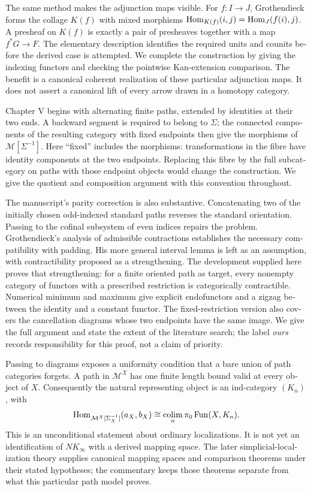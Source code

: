\begin{otherlanguage}{english}
The same method makes the adjunction maps visible. For $f:I\to J$,
Grothendieck forms the collage $K(f)$ with mixed morphisms
$\mathrm{Hom}_{K(f)}(i,j)=\mathrm{Hom}_J(f(i),j)$. A presheaf on $K(f)$ is exactly a
pair of presheaves together with a map $f^*G\to F$. The elementary
description identifies the required units and counits before the derived
case is attempted. We complete the construction by giving the indexing
functors and checking the pointwise Kan-extension comparison. The benefit
is a canonical coherent realization of these particular adjunction maps.
It does not assert a canonical lift of every arrow drawn in a homotopy
category.

Chapter V begins with alternating finite paths, extended by identities at
their two ends. A backward segment is required to belong to $\Sigma$;
the connected components of the resulting category with fixed endpoints
then give the morphisms of $\mathcal M[\Sigma^{-1}]$. Here ``fixed'' includes
the morphisms: transformations in the fibre have identity components at
the two endpoints. Replacing this fibre by the full subcategory on paths
with those endpoint objects would change the construction. We give the
quotient and composition argument with this convention throughout.

The manuscript's parity correction is also substantive. Concatenating two
of the initially chosen odd-indexed standard paths reverses the standard
orientation. Passing to the cofinal subsystem of even indices repairs the
problem. Grothendieck's analysis of admissible contractions establishes the
necessary compatibility with padding. His more general interval lemma is
left as an assumption, with contractibility proposed as a strengthening.
The development supplied here proves that strengthening: for a finite
oriented path as target, every nonempty category of functors with a prescribed
restriction is categorically contractible. Numerical minimum and maximum
give explicit endofunctors and a zigzag between the identity and a constant
functor. The fixed-restriction version also covers the cancellation diagrams
whose two endpoints have the same image. We give the full argument and state
the extent of the literature search; the label \emph{ours} records responsibility
for this proof, not a claim of priority.

Passing to diagrams exposes a uniformity condition that a bare union of
path categories forgets. A path in $\mathcal M^X$ has one finite length
bound valid at every object of $X$. Consequently the natural representing
object is an ind-category $(K_n)$, with
\[
 \mathrm{Hom}_{\mathcal M^X[\Sigma_X^{-1}]}(a_X,b_X)
   \cong\mathop{\rm colim}_n\pi_0\operatorname{Fun}(X,K_n).
\]
This is an unconditional statement about ordinary localizations. It is
not yet an identification of $NK_\infty$ with a derived mapping space.
The later simplicial-localization theory supplies canonical mapping spaces
and comparison theorems under their stated hypotheses; the commentary keeps
those theorems separate from what this particular path model proves.


\end{otherlanguage}
